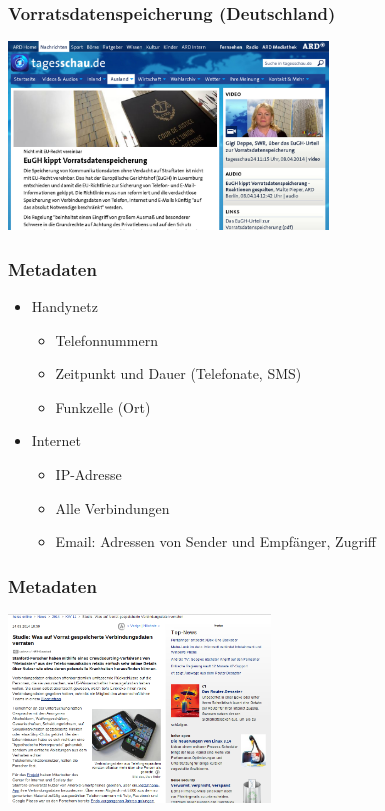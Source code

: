 \documentclass[12pt]{beamer}
\begin{document}
\begin{frame}
  \frametitle{Vorratsdatenspeicherung (Deutschland)}
    \begin{center}
      \includegraphics[height=5cm]{img/tagesschau-vds.png}
    \end{center}
\end{frame}

\begin{frame}
  \frametitle{Metadaten}
  \begin{itemize}
    \item Handynetz
      \begin{itemize}
        \item Telefonnummern
        \item Zeitpunkt und Dauer (Telefonate, SMS)
        \item Funkzelle (Ort)
      \end{itemize}
    \item Internet
      \begin{itemize}
        \item IP-Adresse
        \item Alle Verbindungen
        \item Email: Adressen von Sender und Empfänger, Zugriff
      \end{itemize}
  \end{itemize}
\end{frame}

\begin{frame}
  \frametitle{Metadaten}
    \begin{center}
      \includegraphics[height=5cm]{img/metadaten_studie.png}
    \end{center}
\end{frame}
\end{document}
